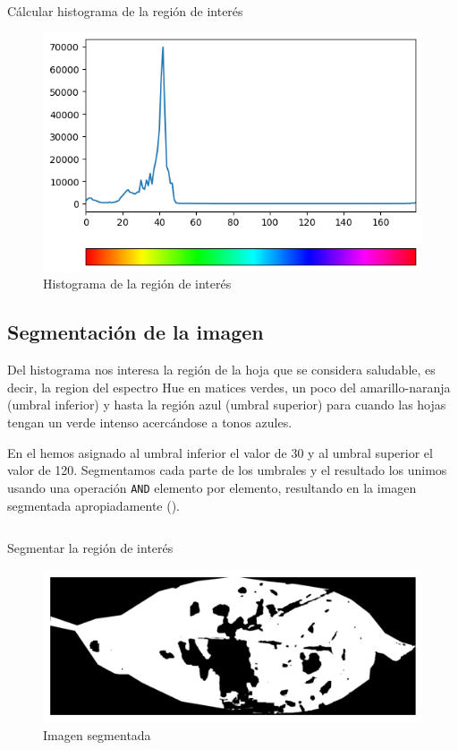 \begin{listing}[!ht]
\inputminted{python}{code_listings/histogram.py}
\caption{Cálcular histograma de la región de interés}
\label{code:histogram}
\end{listing}

\begin{figure}[!ht]
\centering
\includegraphics[width=\textwidth]{images/histogram.png}
\caption{Histograma de la región de interés}
\label{img:histogram}
\end{figure}

\subsection{Segmentación de la imagen}
Del histograma nos interesa la región de la hoja que se considera saludable, es decir, la region del espectro Hue en matices verdes, un poco del amarillo-naranja (umbral inferior) y hasta la región azul (umbral superior) para cuando las hojas tengan un verde intenso acercándose a tonos azules.

En el  hemos asignado al umbral inferior el valor de 30 y al umbral superior el valor de 120. Segmentamos cada parte de los umbrales y el resultado los unimos usando una operación \texttt{AND} elemento por elemento, resultando en la imagen segmentada apropiadamente ().

\begin{listing}[!ht]
\inputminted{python}{code_listings/segmentation.py}
\caption{Segmentar la región de interés}
\label{code:segmentation}
\end{listing}

\begin{figure}[!ht]
\centering
\includegraphics[scale=1]{images/segmentation.png}
\caption{Imagen segmentada}
\label{img:segmentation}
\end{figure}

